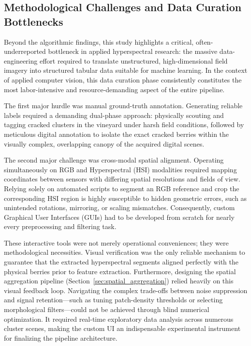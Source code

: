 \subsection{Methodological Challenges and Data Curation Bottlenecks}
\noindent
Beyond the algorithmic findings, this study highlights a critical, often-underreported bottleneck in applied hyperspectral research: the massive data-engineering effort required to translate unstructured, high-dimensional field imagery into structured tabular data suitable for machine learning. In the context of applied computer vision, this data curation phase consistently constitutes the most labor-intensive and resource-demanding aspect of the entire pipeline.

\medskip\noindent
The first major hurdle was manual ground-truth annotation. Generating reliable labels required a demanding dual-phase approach: physically scouting and tagging cracked clusters in the vineyard under harsh field conditions, followed by meticulous digital annotation to isolate the exact cracked berries within the visually complex, overlapping canopy of the acquired digital scenes.

\medskip\noindent
The second major challenge was cross-modal spatial alignment. Operating simultaneously on RGB and Hyperspectral (HSI) modalities required mapping coordinates between sensors with differing spatial resolutions and fields of view. Relying solely on automated scripts to segment an RGB reference and crop the corresponding HSI region is highly susceptible to hidden geometric errors, such as unintended rotations, mirroring, or scaling mismatches. Consequently, custom Graphical User Interfaces (GUIs) had to be developed from scratch for nearly every preprocessing and filtering task. 

\medskip\noindent
These interactive tools were not merely operational conveniences; they were methodological necessities. Visual verification was the only reliable mechanism to guarantee that the extracted hyperspectral segments aligned perfectly with the physical berries prior to feature extraction. Furthermore, designing the spatial aggregation pipeline (Section~\ref{sec:spatial_aggregation}) relied heavily on this visual feedback loop. Navigating the complex trade-offs between noise suppression and signal retention---such as tuning patch-density thresholds or selecting morphological filters---could not be achieved through blind numerical optimization. It required real-time exploratory data analysis across numerous cluster scenes, making the custom UI an indispensable experimental instrument for finalizing the pipeline architecture.

